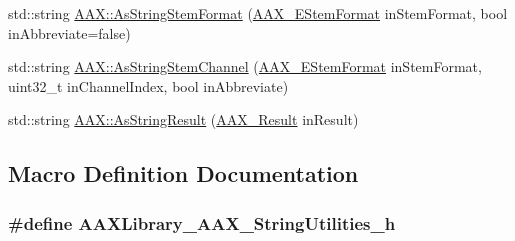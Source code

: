 \begin{DoxyCompactItemize}
\item 
std\+::string \hyperlink{a00288_a34d219233eb5c9836b837fa2a67150d1}{A\+A\+X\+::\+As\+String\+Stem\+Format} (\hyperlink{a00206_ad8af5ef008b2bd478add9a0acb0a1d85}{A\+A\+X\+\_\+\+E\+Stem\+Format} in\+Stem\+Format, bool in\+Abbreviate=false)
\item 
std\+::string \hyperlink{a00288_adfab6bf193c09266ecec2069b8da0c5c}{A\+A\+X\+::\+As\+String\+Stem\+Channel} (\hyperlink{a00206_ad8af5ef008b2bd478add9a0acb0a1d85}{A\+A\+X\+\_\+\+E\+Stem\+Format} in\+Stem\+Format, uint32\+\_\+t in\+Channel\+Index, bool in\+Abbreviate)
\item 
std\+::string \hyperlink{a00288_a354029650cebc5f23636c9984a65ea0d}{A\+A\+X\+::\+As\+String\+Result} (\hyperlink{a00149_a4d8f69a697df7f70c3a8e9b8ee130d2f}{A\+A\+X\+\_\+\+Result} in\+Result)
\end{DoxyCompactItemize}


\subsection{Macro Definition Documentation}
\hypertarget{a00296_aea61cbef0d0ebbae3c538af4531460df}{}
\subsubsection[{A\+A\+X\+Library\+\_\+\+A\+A\+X\+\_\+\+String\+Utilities\+\_\+h}]{\setlength{\rightskip}{0pt plus 5cm}\#define A\+A\+X\+Library\+\_\+\+A\+A\+X\+\_\+\+String\+Utilities\+\_\+h}\label{a00296_aea61cbef0d0ebbae3c538af4531460df}
